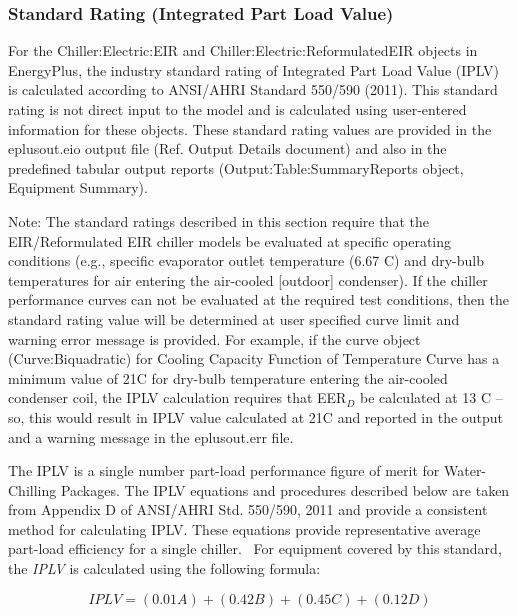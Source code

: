 \subsubsection{Standard Rating (Integrated Part Load Value)}\label{standard-rating-integrated-part-load-value}

For the Chiller:Electric:EIR and Chiller:Electric:ReformulatedEIR objects in EnergyPlus, the industry standard rating of Integrated Part Load Value (IPLV) is calculated according to ANSI/AHRI Standard 550/590 (2011). This standard rating is not direct input to the model and is calculated using user-entered information for these objects. These standard rating values are provided in the eplusout.eio output file (Ref. Output Details document) and also in the predefined tabular output reports (Output:Table:SummaryReports object, Equipment Summary).

\begin{callout}
Note: The standard ratings described in this section require that the EIR/Reformulated EIR chiller models be evaluated at specific operating conditions (e.g., specific evaporator outlet temperature (6.67 C) and dry-bulb temperatures for air entering the air-cooled {[}outdoor{]} condenser). If the chiller~ performance curves can not be evaluated at the required test conditions, then the standard rating value will be determined at user specified curve limit and warning error message is provided. For example, if the curve object (Curve:Biquadratic) for Cooling Capacity Function of Temperature Curve has a minimum value of 21C for dry-bulb temperature entering the air-cooled condenser coil, the IPLV calculation requires that EER\(_{D}\) be calculated at 13 C -- so, this would result in IPLV value calculated at 21C and reported in the output and a warning message in the eplusout.err file.
\end{callout}

The IPLV is a single number part-load performance figure of merit for Water-Chilling Packages. The IPLV equations and procedures described below are taken from Appendix D of ANSI/AHRI Std. 550/590, 2011 and provide a consistent method for calculating IPLV. These equations provide representative average part-load efficiency for a single chiller. ~For equipment covered by this standard, the \emph{IPLV} is calculated using the following formula:

\begin{equation}
IPLV = (0.01A) + (0.42B) + (0.45C) + (0.12D)
\end{equation}


